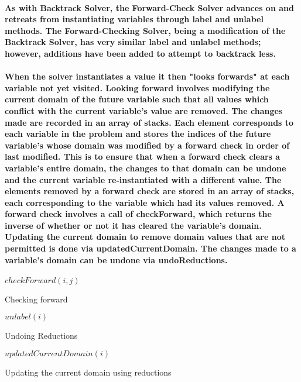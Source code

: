 \documentclass{article}
\begin{document}
\paragraph*{As with Backtrack Solver, the Forward-Check Solver advances on and retreats from instantiating variables through label and unlabel methods. The Forward-Checking Solver, being a modification of the Backtrack Solver, has very similar label and unlabel methods; however, additions have been added to attempt to backtrack less.}

\paragraph*{When the solver instantiates a value it then "looks forwards" at each variable not yet visited. Looking forward involves modifying the current domain of the future variable such that all values which conflict with the current variable's value are removed. The changes made are recorded in an array of stacks. Each element corresponds to each variable in the problem and stores the indices of the future variable's whose domain was modified by a forward check in order of last modified. This is to ensure that when a forward check clears a variable's entire domain, the changes to that domain can be undone and the current variable re-instantiated with a different value. The elements removed by a forward check are stored in an array of stacks, each corresponding to the variable which had its values removed. A forward check involves a call of checkForward, which returns the inverse of whether or not it has cleared the variable's domain. Updating the current domain to remove domain values that are not permitted is done via updatedCurrentDomain. The changes made to a variable's domain can be undone via undoReductions.}

\begin{algorithm}
\DontPrintSemicolon
\nl $checkForward(i, j)$\;
\nl {}
\caption{Checking forward}
\label{checkForward}
\end{algorithm}

\begin{algorithm}
\DontPrintSemicolon
\nl $unlabel(i)$\;
\nl {}
\caption{Undoing Reductions}
\label{undoReductions}
\end{algorithm}

\begin{algorithm}
\DontPrintSemicolon
\nl $updatedCurrentDomain(i)$\;
\nl \Begin{
}
\caption{Updating the current domain using reductions}
\label{updateCurrentDomain}
\end{algorithm}



\end{document}

